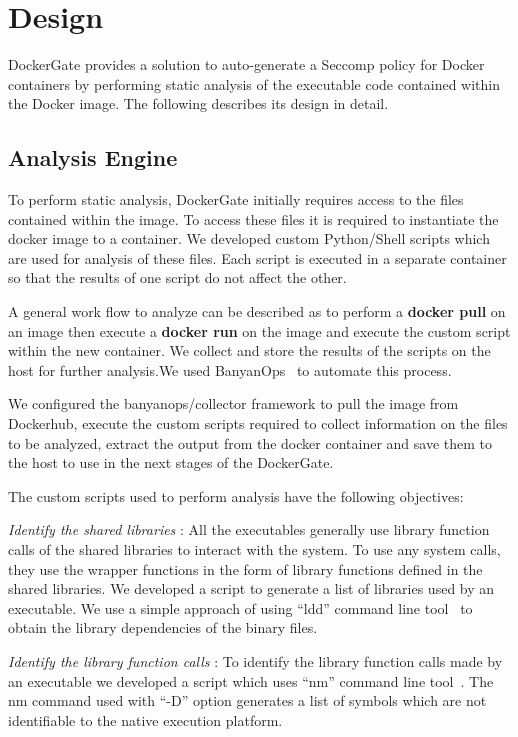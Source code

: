 \section{Design}
\label{sec:design}
DockerGate provides a solution to auto-generate a Seccomp policy for Docker containers by performing static analysis of the executable code contained within the Docker image. The following describes its design in detail.

\subsection{Analysis Engine}

To perform static analysis, DockerGate initially requires access to the files contained within the image. To access these files it is required to instantiate the docker image to a container. We developed custom Python/Shell scripts which are  used for analysis of these files. Each script is executed in a separate container so that the results of one script do not affect the other. 

A general work flow to analyze can be described as to perform a \textbf{docker pull} on an image then execute a \textbf{docker run} on the image and execute the custom script within the new container. We collect and store the results of the scripts on the host for further analysis.We used BanyanOps~\cite{banyanops} to automate this process.

We configured the banyanops/collector framework to pull the image from Dockerhub, execute the custom scripts required to collect information on the files to be analyzed, extract the output from the docker container and save them to the host to use in the next stages of the DockerGate.

The custom scripts used to perform analysis have the following objectives:

\textit{Identify the shared libraries} : All the executables generally use library function calls of the shared libraries to interact with the system. To use any system calls, they use the wrapper functions in the form of library functions defined in the shared libraries. We developed a script to generate a list of libraries used by an executable. We use a simple approach of using “ldd” command line tool~\cite{ldd} to obtain the library dependencies of the binary files.

\textit{Identify the library function calls} : To identify the library function calls made by an executable we developed a script which uses “nm” command line tool~\cite{nm}. The nm command used with “-D” option generates a list of symbols which are not identifiable to the native execution platform.
 
